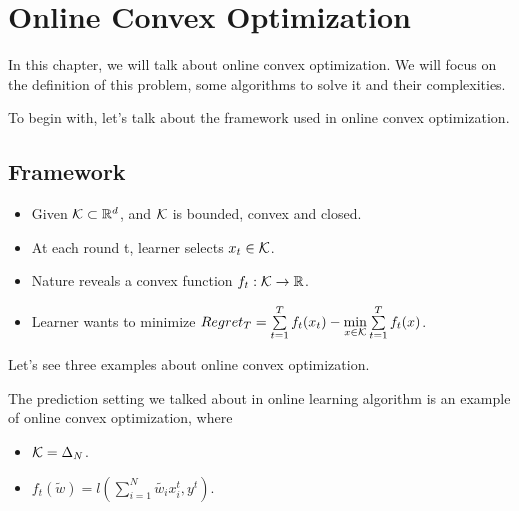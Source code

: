 \documentclass[../main.tex]{subfiles}
\begin{document}
\chapter{Online Convex Optimization}
In this chapter, we will talk about online convex optimization. We will focus on the definition of this problem, some algorithms to solve it and their complexities.

To begin with, let's talk about the framework used in online convex optimization.

\section{Framework}

\begin{itemize}
	\item Given $\mathcal{K} \subset \mathbb{R}^d$, and $\mathcal{K}$ is bounded, convex and closed.
	\item At each round t, learner selects $x_t \in \mathcal{K}$.
	\item Nature reveals a convex function $f_t: \mathcal{K} \to \mathbb{R}$.
	\item Learner wants to minimize $Regret_T = \sum\limits_{t = 1}^T f_t(x_t) - \min\limits_{x\in \mathcal{K}}  \sum\limits_{t = 1}^T f_t(x)$.
\end{itemize}

Let's see three examples about online convex optimization.

\begin{example}
	The prediction setting we talked about in online learning algorithm is an example of online convex optimization, where
	
	\begin{itemize}
		\item $\mathcal{K} = \Delta_N$.
		\item $f_t(\tilde{w}) = l(\sum\limits_{i=1}^N \tilde{w_i} x_i^t, y^t)$.
	\end{itemize}
\end{example}
\end{document}
